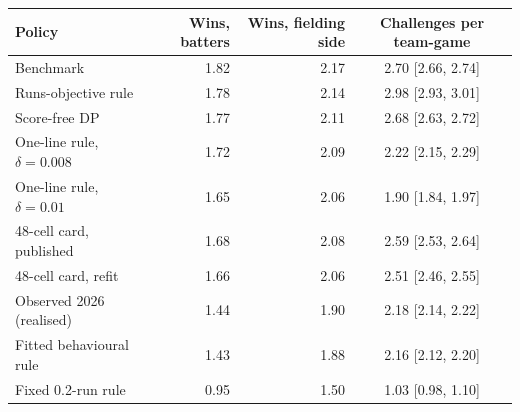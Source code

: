 \begin{tabular}{lrrc}
\toprule
Policy & Wins, batters & Wins, fielding side & Challenges per team-game \\
\midrule
Benchmark & 1.82 & 2.17 & 2.70 [2.66, 2.74] \\
Runs-objective rule & 1.78 & 2.14 & 2.98 [2.93, 3.01] \\
Score-free DP & 1.77 & 2.11 & 2.68 [2.63, 2.72] \\
One-line rule, $\delta=0.008$ & 1.72 & 2.09 & 2.22 [2.15, 2.29] \\
One-line rule, $\delta=0.01$ & 1.65 & 2.06 & 1.90 [1.84, 1.97] \\
48-cell card, published & 1.68 & 2.08 & 2.59 [2.53, 2.64] \\
48-cell card, refit & 1.66 & 2.06 & 2.51 [2.46, 2.55] \\
Observed 2026 (realised) & 1.44 & 1.90 & 2.18 [2.14, 2.22] \\
Fitted behavioural rule & 1.43 & 1.88 & 2.16 [2.12, 2.20] \\
Fixed 0.2-run rule & 0.95 & 1.50 & 1.03 [0.98, 1.10] \\
\bottomrule
\end{tabular}
